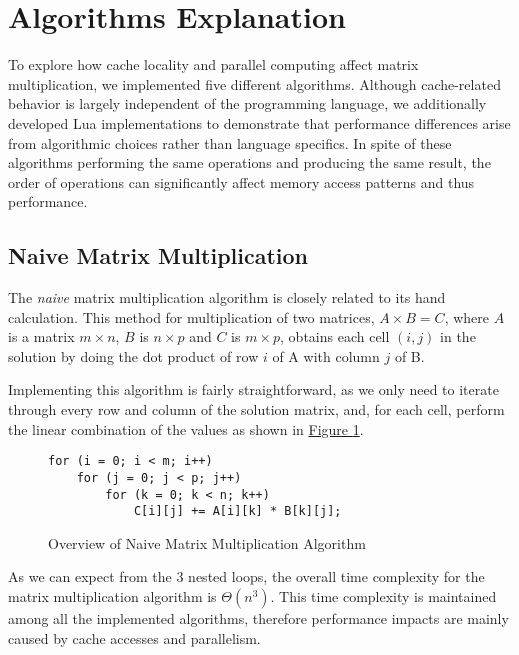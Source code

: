 \section{Algorithms Explanation} \label{section:algorithms}

To explore how cache locality and parallel computing affect matrix multiplication, we implemented five different algorithms. Although cache-related behavior is largely independent of the programming language, we additionally developed Lua implementations to demonstrate that performance differences arise from algorithmic choices rather than language specifics. In spite of these algorithms performing the same operations and producing the same result, the order of operations can significantly affect memory access patterns and thus performance.

\subsection{Naive Matrix Multiplication} \label{section:algorithms:naive}

The \textit{naive} matrix multiplication algorithm is closely related to its hand calculation. This method for multiplication of two matrices, $A \times B = C$, where $A$ is a matrix $m \times n$, $B$ is $n \times p$ and $C$ is $m \times p$, obtains each cell $(i, j)$ in the solution by doing the dot product of row $i$ of A with column $j$ of B.

Implementing this algorithm is fairly straightforward, as we only need to iterate through every row and column of the solution matrix, and, for each cell, perform the linear combination of the values as shown in \hyperref[fig:algo:naive]{Figure \ref{fig:algo:naive}}.

\begin{figure}[ht!]
\begin{verbatim}
for (i = 0; i < m; i++)
    for (j = 0; j < p; j++)
        for (k = 0; k < n; k++)
            C[i][j] += A[i][k] * B[k][j];
\end{verbatim}
\caption{Overview of Naive Matrix Multiplication Algorithm}
\label{fig:algo:naive}
\end{figure}

As we can expect from the 3 nested loops, the overall time complexity for the matrix multiplication algorithm is $\Theta (n^3)$. This time complexity is maintained among all the implemented algorithms, therefore performance impacts are mainly caused by cache accesses and parallelism.

